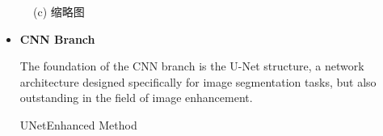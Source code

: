 \documentclass[CJK,aspectratio=169]{beamer}  %
\begin{document}
\begin{frame}
\begin{figure}
\begin{minipage}{.28\textwidth}
				\captionsetup{font=scriptsize}
				\label{fig: The proposed initial architecture(Abstract Picture)}	
				\caption*{\tiny (c) 缩略图}
			\end{minipage}
			\captionsetup{font=scriptsize}
			\caption{
				\label{fig: Parallel architecture combining u-net and transformer}
			}
		\end{figure}
		
	\end{frame}
	
	\begin{frame}
		
		\begin{itemize} 
			\item \textbf{CNN Branch}
			
			\small The foundation of the CNN branch is the U-Net structure, a network architecture designed specifically for image segmentation tasks, but also outstanding in the field of image enhancement.
			
			\checkmark \small UNetEnhanced Method
		\end{itemize}
		
		
		

\end{frame}
\end{document}
